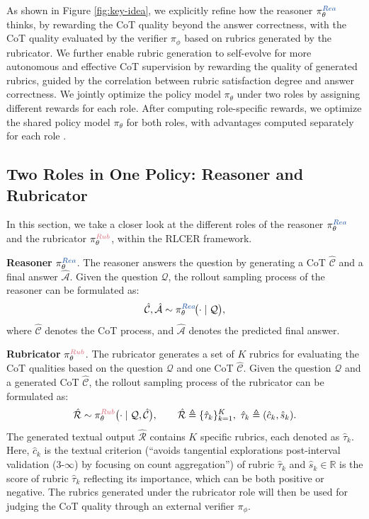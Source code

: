 As shown in Figure \ref{fig:key-idea}, we explicitly refine how the reasoner $\pi_{\theta}^{\text{\textcolor{reasoner}{$Rea$}}}$ thinks, by rewarding the CoT quality beyond the answer correctness, with the CoT quality evaluated by the verifier $\pi_\phi$ based on rubrics generated by the rubricator. 
We further enable rubric generation to self-evolve for more autonomous and effective CoT supervision by rewarding the quality of generated rubrics, guided by the correlation between rubric satisfaction degree and answer correctness.
We jointly optimize the policy model $\pi_\theta$ under two roles by assigning different rewards for each role. 
After computing role-specific rewards, we optimize the shared policy model $\pi_\theta$ for both roles, with advantages computed separately for each role \cite{SPICE}.


\subsection{Two Roles in One Policy: Reasoner and Rubricator} \label{sec:roles}
In this section, we take a closer look at the different roles of the reasoner $\pi_{\theta}^{\text{\textcolor{reasoner}{$Rea$}}}$ and the rubricator $\pi_{\theta}^{\text{\textcolor{rubricator}{$Rub$}}}$, within the RLCER framework.

\textbf{Reasoner} $\pi_{\theta}^{\text{\textcolor{reasoner}{$Rea$}}}$. 
The reasoner answers the question by generating a CoT $\hat{\mathcal C}$ and a final answer $\hat{\mathcal A}$.
Given the question $\mathcal Q$, the rollout sampling process of the reasoner can be formulated as:
\begin{equation}
\hat{\mathcal C}, \hat{\mathcal A} \sim 
\pi_{\theta}^{\text{\textcolor{reasoner}{$Rea$}}}\!\big(\cdot \mid \mathcal Q\big),
\end{equation}
where $\hat{\mathcal C}$ denotes the CoT process, and $\hat{\mathcal A}$ denotes the predicted final answer.

\textbf{Rubricator} $\pi_{\theta}^{\text{\textcolor{rubricator}{$Rub$}}}$.
The rubricator generates a set of $K$ rubrics for evaluating the CoT qualities based on the question $\mathcal Q$ and one CoT $\hat{\mathcal C}$. 
Given the question $\mathcal Q$ and a generated CoT $\hat{\mathcal C}$, the rollout sampling process of the rubricator can be formulated as:
\begin{equation}
\hat{\mathcal R} \sim 
\pi_{\theta}^{\text{\textcolor{rubricator}{$Rub$}}}
\big(\cdot \mid \mathcal Q, \hat{\mathcal C}\big),
\qquad
\hat{\mathcal R} \triangleq \{\hat{\tau}_k\}_{k=1}^{K},
\ \hat{\tau}_k \triangleq (\hat c_k,\hat s_k).
\end{equation}
The generated textual output $\hat{\mathcal R}$ contains $K$ specific rubrics, each denoted as $\hat{\tau}_k$. Here, $\hat c_k$ is the textual criterion (\eg ``avoids tangential explorations post-interval validation (3-$\infty$) by focusing on count aggregation'') of rubric $\hat{\tau}_k$ and $\hat s_k \in \mathbb{R}$ is the score of rubric $\hat{\tau}_k$ reflecting its importance, which can be both positive or negative. 
The rubrics generated under the rubricator role will then be used for judging the CoT quality through an external verifier $\pi_\phi$.

